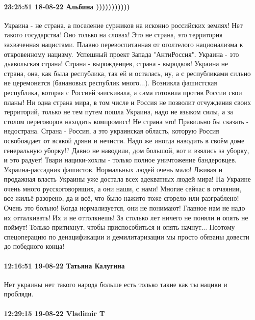 \paragraph{23:25:51 18-08-22 Альбина )))))))))))}

Украина - не страна, а поселение суржиков на исконно российских землях! Нет
такого государства! Оно только на словах! Это не страна, это территория
захваченная нацистами. Плавно перевоспитанная от оголтелого национализма к
откровенному нацизму. Успешный проект Запада "АнтиРоссия". Украина - это
дьявольская страна! Страна - вырожденцев, страна - выродков! Украина не страна,
она, как была республика, так ей и осталась, ну, а с республиками сильно не
церемонятся (банановых республик много...). Возникла фашистская республика,
которая с Россией заискивала, а сама готовила против России свои планы! Ни одна
страна мира, в том числе и Россия не позволит отчуждения своих территорий,
только не тем путем пошла Украина, надо не языком силы, а за столом переговоров
находить компромисс! Не страна это! Правильно бы сказать - недострана. Страна -
Россия, а это украинская область, которую Россия освобождает от всякой дряни и
нечисти. Надо же иногда наводить в своём доме генеральную уборку!? Давно не
наводили, дом большой, вот и взялись за уборку, и это радует! Твари
нацики-хохлы - только полное уничтожение бандеровцев. Украина-рассадник
фашистов. Нормальных людей очень мало! Лживая и продажная власть Украины уже
достала всех адекватных людей мира! На Украине очень много русскоговорящих, а
они наши, с нами! Многие сейчас в отчаянии, все жильё разорено, да и всё, что
было нажито тоже сгорело или разграблено! Очень это больно! Когда
нормализуется, они не понимают! Главное нам не надо их отталкивать! Их и не
оттолкнешь! За столько лет ничего не поняли и опять не поймут! Только
притихнут, чтобы приспособиться и опять начнут... Поэтому спецоперацию по
денацификации и демилитаризации мы просто обязаны довести до победного конца!

\paragraph{12:16:51 19-08-22 Татьяна Калугина}

Нет украины нет такого народа больше есть только такие как ты нацики и пробляди.

\paragraph{12:29:15 19-08-22 Vladimir T}

